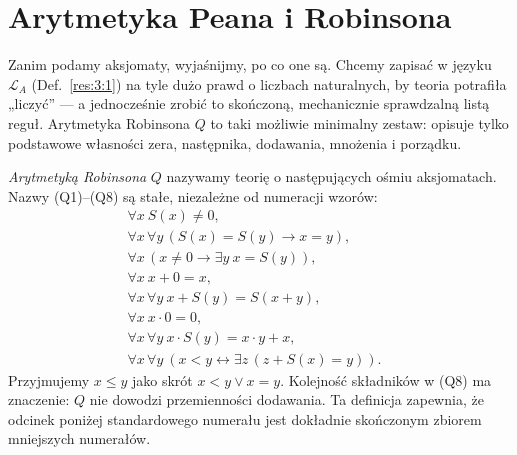 \section{Arytmetyka Peana i Robinsona}\label{sec:arytmetyka-peana-robinsona}
Zanim podamy aksjomaty, wyjaśnijmy, po co one są. Chcemy zapisać w języku $\mathcal L_A$ (Def.~\ref{res:3:1}) na tyle dużo prawd o liczbach naturalnych, by teoria potrafiła „liczyć” --- a jednocześnie zrobić to skończoną, mechanicznie sprawdzalną listą reguł. Arytmetyka Robinsona $Q$ to taki możliwie minimalny zestaw: opisuje tylko podstawowe własności zera, następnika, dodawania, mnożenia i porządku.

\begin{definicja}\label{res:4:1}
\emph{Arytmetyką Robinsona} $Q$ nazywamy teorię o następujących ośmiu aksjomatach. Nazwy (Q1)--(Q8) są stałe, niezależne od numeracji wzorów:
\begin{align*}
\forall x\ S(x)\ne0, &\tag{Q1}\\
\forall x\,\forall y\,(S(x)=S(y)\to x=y), &\tag{Q2}\\
\forall x\,(x\ne0\to\exists y\ x=S(y)), &\tag{Q3}\\
\forall x\ x+0=x, &\tag{Q4}\\
\forall x\,\forall y\ x+S(y)=S(x+y), &\tag{Q5}\\
\forall x\ x\cdot0=0, &\tag{Q6}\\
\forall x\,\forall y\ x\cdot S(y)=x\cdot y+x, &\tag{Q7}\\
\forall x\,\forall y\ (x<y\leftrightarrow\exists z\,(z+S(x)=y)). &\tag{Q8}
\end{align*}
Przyjmujemy $x\le y$ jako skrót $x<y\lor x=y$. Kolejność składników w (Q8) ma znaczenie: $Q$ nie dowodzi przemienności dodawania. Ta definicja zapewnia, że odcinek poniżej standardowego numerału jest dokładnie skończonym zbiorem mniejszych numerałów.
\end{definicja}

